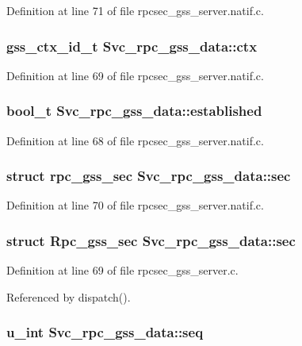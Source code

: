 Definition at line 71 of file rpcsec\_\-gss\_\-server.natif.c.
\subsubsection{\setlength{\rightskip}{0pt plus 5cm}gss\_\-ctx\_\-id\_\-t {\bf Svc\_\-rpc\_\-gss\_\-data::ctx}}\label{structSvc__rpc__gss__data_o1}




Definition at line 69 of file rpcsec\_\-gss\_\-server.natif.c.
\subsubsection{\setlength{\rightskip}{0pt plus 5cm}bool\_\-t {\bf Svc\_\-rpc\_\-gss\_\-data::established}}\label{structSvc__rpc__gss__data_o0}




Definition at line 68 of file rpcsec\_\-gss\_\-server.natif.c.
\subsubsection{\setlength{\rightskip}{0pt plus 5cm}struct rpc\_\-gss\_\-sec {\bf Svc\_\-rpc\_\-gss\_\-data::sec}}\label{structSvc__rpc__gss__data_o9}




Definition at line 70 of file rpcsec\_\-gss\_\-server.natif.c.
\subsubsection{\setlength{\rightskip}{0pt plus 5cm}struct Rpc\_\-gss\_\-sec {\bf Svc\_\-rpc\_\-gss\_\-data::sec}}\label{structSvc__rpc__gss__data_o2}




Definition at line 69 of file rpcsec\_\-gss\_\-server.c.

Referenced by dispatch().
\subsubsection{\setlength{\rightskip}{0pt plus 5cm}u\_\-int {\bf Svc\_\-rpc\_\-gss\_\-data::seq}}\label{structSvc__rpc__gss__data_o4}




